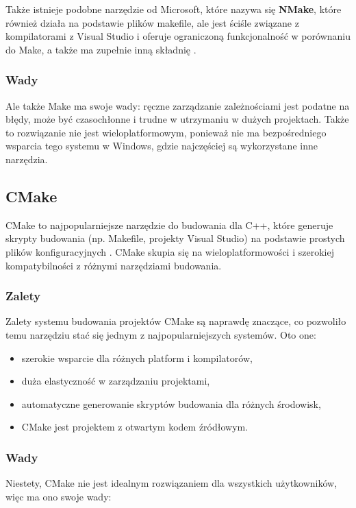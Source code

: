Także istnieje podobne narzędzie od Microsoft, które nazywa się \textbf{NMake}, które również działa na podstawie plików makefile, ale jest ściśle związane z kompilatorami z Visual Studio i oferuje ograniczoną funkcjonalność w porównaniu do Make, a także ma zupełnie inną składnię \cite{nmake}.

\subsubsection{Wady}
Ale także Make ma swoje wady: ręczne zarządzanie zależnościami jest podatne na błędy, może być czasochłonne i trudne w utrzymaniu w dużych projektach. Także to rozwiązanie nie jest wieloplatformowym, ponieważ nie ma bezpośredniego wsparcia tego systemu w Windows, gdzie najczęściej są wykorzystane inne narzędzia.

\subsection{CMake}
CMake to najpopularniejsze narzędzie do budowania dla C++, które generuje skrypty budowania (np. Makefile, projekty Visual Studio) na podstawie prostych plików konfiguracyjnych \cite{cmake}. CMake skupia się na wieloplatformowości i szerokiej kompatybilności z różnymi narzędziami budowania.

\subsubsection{Zalety}
Zalety systemu budowania projektów CMake są naprawdę znaczące, co pozwoliło temu narzędziu stać się jednym z najpopularniejszych systemów. Oto one:

\begin{itemize}
    \item szerokie wsparcie dla różnych platform i kompilatorów,
    \item duża elastyczność w zarządzaniu projektami,
    \item automatyczne generowanie skryptów budowania dla różnych środowisk,
    \item CMake jest projektem z otwartym kodem źródłowym.
\end{itemize}

\subsubsection{Wady}
Niestety, CMake nie jest idealnym rozwiązaniem dla wszystkich użytkowników, więc ma ono swoje wady:

